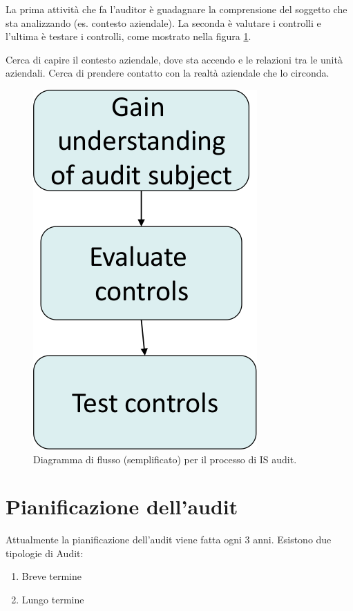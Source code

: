 La prima attività che fa l'auditor è guadagnare la comprensione del soggetto 
che sta analizzando (es. contesto aziendale).
La seconda è valutare i controlli e l'ultima è testare i controlli, come 
mostrato nella figura \ref{fig:is:audit:definition}.


Cerca di capire il contesto aziendale, dove sta accendo e le relazioni tra le 
unità aziendali. Cerca di prendere contatto con la realtà aziendale che lo 
circonda.


\begin{figure}[h!]
	\begin{center}
		\includegraphics[scale=0.4]{res/img/is_audit_definition.png}
	\end{center}
	\caption{Diagramma di flusso (semplificato) per il processo di IS 
audit.}
	\label{fig:is:audit:definition}
\end{figure}

\section{Pianificazione dell'audit}

Attualmente la pianificazione dell'audit viene fatta ogni 3 anni.
Esistono due tipologie di Audit:
\begin{enumerate}
\item Breve termine 
\item Lungo termine

\end{enumerate}

